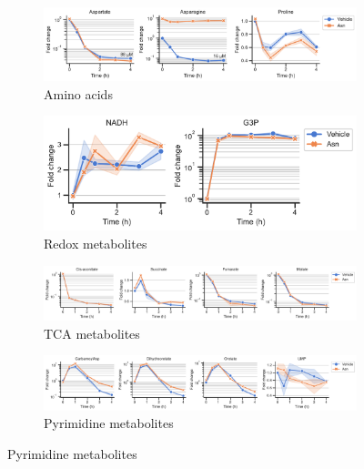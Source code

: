 \begin{figure}[!ht]
     \centering
     \begin{subfigure}[b]{0.68\textwidth}
         \includegraphics[width=\textwidth]{figures/chap2/app/HT1080_Anti_AA.pdf}
         \caption{Amino acids}
         \label{fig:app_ch2:HT1080_Anti_AA}
     \end{subfigure}
     \hfill
     \begin{subfigure}[b]{0.45\textwidth}
         \includegraphics[width=\textwidth]{figures/chap2/app/HT1080_Anti_rd.pdf}
         \caption{Redox metabolites}
         \label{fig:app_ch2:HT1080_Anti_rd}
     \end{subfigure}
     \hfill
     \begin{subfigure}[b]{0.9\textwidth}
         \includegraphics[width=\textwidth]{figures/chap2/app/HT1080_Anti_tca.pdf}
         \caption{TCA metabolites}
         \label{fig:app_ch2:HT1080_Anti_tca}
     \end{subfigure}
     \hfill
     \begin{subfigure}[b]{0.9\textwidth}
         \includegraphics[width=\textwidth]{figures/chap2/app/HT1080_Anti_pyr.pdf}
         \caption{Pyrimidine metabolites}

\end{subfigure}
\end{figure}
